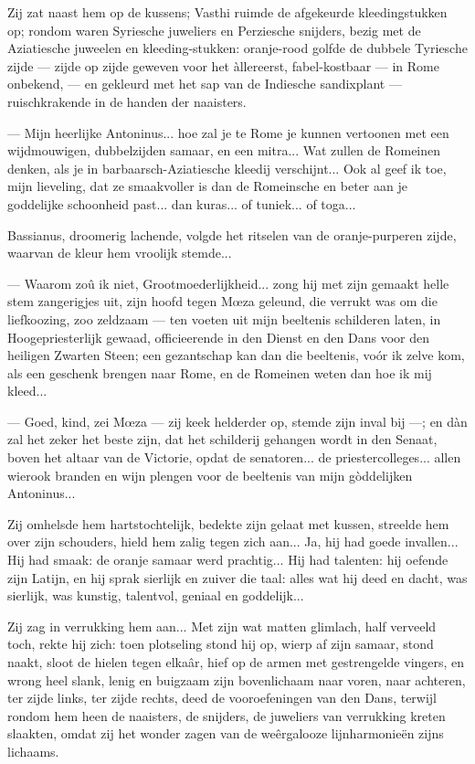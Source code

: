 \documentclass[a4paper, 12pt, oneside, dutch]{article}
\begin{document}
Zij zat naast hem op de kussens; Vasthi ruimde de afgekeurde kleedingstukken op; rondom waren Syriesche juweliers en Perziesche snijders, bezig met de Aziatiesche juweelen en kleeding-stukken: oranje-rood golfde de dubbele Tyriesche zijde --- zijde op zijde geweven voor het àllereerst, fabel-kostbaar --- in Rome onbekend, --- en gekleurd met het sap van de Indiesche sandixplant --- ruischkrakende in de handen der naaisters.

--- Mijn heerlijke Antoninus... hoe zal je te Rome je kunnen vertoonen met een wijdmouwigen, dubbelzijden samaar, en een mitra... Wat zullen de Romeinen denken, als je in barbaarsch-Aziatiesche kleedij verschijnt... Ook al geef ik toe, mijn lieveling, dat ze smaakvoller is dan de Romeinsche en beter aan je goddelijke schoonheid past... dan kuras... of tuniek... of toga...

Bassianus, droomerig lachende, volgde het ritselen van de oranje-purperen zijde, waarvan de kleur hem vroolijk stemde...

--- Waarom zoû ik niet, Grootmoederlijkheid... zong hij met zijn gemaakt helle stem zangerigjes uit, zijn hoofd tegen Mœza geleund, die verrukt was om die liefkoozing, zoo zeldzaam --- ten voeten uit mijn beeltenis schilderen laten, in Hoogepriesterlijk gewaad, officieerende in den Dienst en den Dans voor den heiligen Zwarten Steen; een gezantschap kan dan die beeltenis, voór ik zelve kom, als een geschenk brengen naar Rome, en de Romeinen weten dan hoe ik mij kleed...

--- Goed, kind, zei Mœza --- zij keek helderder op, stemde zijn inval bij ---; en dàn zal het zeker het beste zijn, dat het schilderij gehangen wordt in den Senaat, boven het altaar van de Victorie, opdat de senatoren... de priestercolleges... allen wierook branden en wijn plengen voor de beeltenis van mijn gòddelijken Antoninus...

Zij omhelsde hem hartstochtelijk, bedekte zijn gelaat met kussen, streelde hem over zijn schouders, hield hem zalig tegen zich aan... Ja, hij had goede invallen... Hij had smaak: de oranje samaar werd prachtig... Hij had talenten: hij oefende zijn Latijn, en hij sprak sierlijk en zuiver die taal: alles wat hij deed en dacht, was sierlijk, was kunstig, talentvol, geniaal en goddelijk...

Zij zag in verrukking hem aan... Met zijn wat matten glimlach, half verveeld toch, rekte hij zich: toen plotseling stond hij op, wierp af zijn samaar, stond naakt, sloot de hielen tegen elkaâr, hief op de armen met gestrengelde vingers, en wrong heel slank, lenig en buigzaam zijn bovenlichaam naar voren, naar achteren, ter zijde links, ter zijde rechts, deed de vooroefeningen van den Dans, terwijl rondom hem heen de naaisters, de snijders, de juweliers van verrukking kreten slaakten, omdat zij het wonder zagen van de weêrgalooze lijnharmonieën zijns lichaams.
\end{document}
